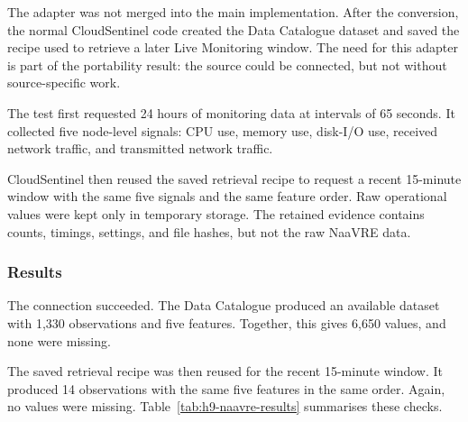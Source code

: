 The adapter was not merged into the main implementation. After the conversion, the normal CloudSentinel code created the Data Catalogue dataset and saved the recipe used to retrieve a later Live Monitoring window. The need for this adapter is part of the portability result: the source could be connected, but not without source-specific work.

The test first requested 24 hours of monitoring data at intervals of 65 seconds. It collected five node-level signals: CPU use, memory use, disk-I/O use, received network traffic, and transmitted network traffic.

CloudSentinel then reused the saved retrieval recipe to request a recent 15-minute window with the same five signals and the same feature order. Raw operational values were kept only in temporary storage. The retained evidence contains counts, timings, settings, and file hashes, but not the raw NaaVRE data.

\subsubsection{Results}

The connection succeeded. The Data Catalogue produced an available dataset with 1,330 observations and five features. Together, this gives 6,650 values, and none were missing.

The saved retrieval recipe was then reused for the recent 15-minute window. It produced 14 observations with the same five features in the same order. Again, no values were missing. Table~\ref{tab:h9-naavre-results} summarises these checks.


